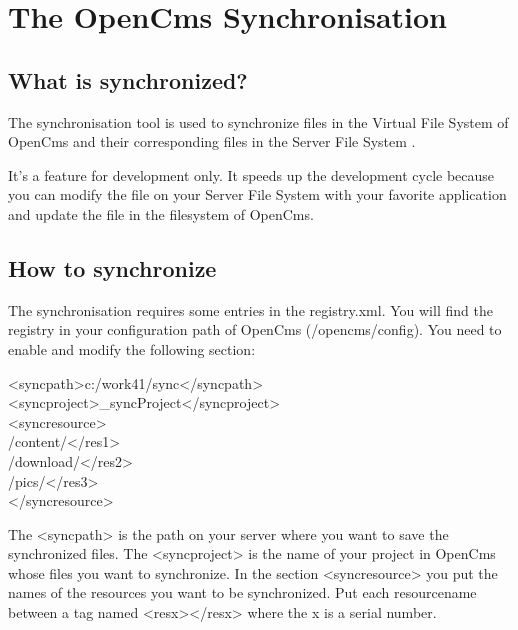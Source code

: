 \section{The OpenCms Synchronisation}
\label{synchronisation}

\subsection{What is synchronized?}
The synchronisation tool  is used to synchronize  files in the Virtual File System  of OpenCms and their corresponding files in the Server File System . 

It's a feature for development only. It speeds up the development cycle because you can modify the file on your Server File System with your favorite application and update the file in the filesystem of OpenCms.

\subsection{How to synchronize}
The synchronisation requires some entries in the {\dir registry.xml}. You will find the registry in your configuration path of OpenCms ({\dir /opencms/config}). You need to enable and modify the following section:

\begin{xml}
<syncpath>c:/work41/sync</syncpath>\\
<syncproject>\_syncProject</syncproject>\\
<syncresource>\\
\xtaba	<res1>/content/</res1>\\
\xtaba	<res2>/download/</res2>\\
\xtaba	<res3>/pics/</res3>\\
</syncresource>\\
\end{xml}

The {\tag <syncpath>}  is the path on your server where you want to save the synchronized files. The {\tag <syncproject>}  is the name of your project in OpenCms whose files you want to synchronize. In the section {\tag <syncresource>}  you put the names of the resources you want to be synchronized. Put each resourcename between a tag named {\tag <resx></resx>} where the {\name x} is a serial number.

